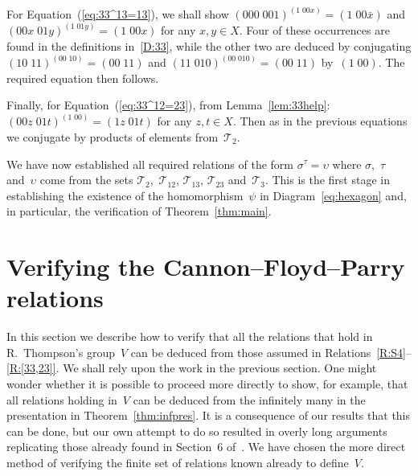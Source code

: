 \documentclass[a4paper,11pt]{article}
\numberwithin{equation}{section}
\newcommand{\eqstate}[1]{Equation~(\ref{#1})}
\newcommand{\spc}{\vspace{\baselineskip}}
\newcommand{\swap}[2]{(#1\;#2)}
\newcommand{\Sw}[1]{\mathcal{T}_{#1}}
\begin{document}
For \eqstate{eq:33^13=13}, we shall show
$\swap{000}{001}^{\swap{1}{00x}} = \swap{1}{00\bar{x}}$ and
$\swap{00x}{01y}^{\swap{1}{01y}} = \swap{1}{00x}$ for any $x,y \in X$.
Four of these occurrences are found in the definitions
in~\eqref{D:33}, while the other two are deduced by conjugating
$\swap{10}{11}^{\swap{00}{10}} = \swap{00}{11}$ and
$\swap{11}{010}^{\swap{00}{010}} = \swap{00}{11}$ by~$\swap{1}{00}$.
The required equation then follows.

Finally, for \eqstate{eq:33^12=23}, from
Lemma~\ref{lem:33help}: $\swap{00z}{01t}^{\swap{1}{00}} =
\swap{1z}{01t}$ for any $z,t \in X$.  Then as in the previous
equations we conjugate by products of elements from~$\Sw{2}$.

\spc

We have now established all required relations of the form
$\sigma^{\tau} = \upsilon$ where $\sigma$,~$\tau$ and~$\upsilon$ come
from the sets $\Sw{2}$,~$\Sw{12}$, $\Sw{13}$, $\Sw{23}$ and~$\Sw{3}$.
This is the first stage in establishing the existence of the
homomorphism~$\psi$ in Diagram~\eqref{eq:hexagon} and, in particular,
the verification of Theorem~\ref{thm:main}.


\section{Verifying the Cannon--Floyd--Parry relations}
\label{sec:CFP}

In this section we describe how to verify that all the relations that
hold in R.~Thompson's group~$V$ can be deduced from those assumed in
Relations~\ref{R:S4}--\ref{R:[33,23]}.  We shall rely upon the work in
the previous section.  One might wonder whether it is possible to
proceed more directly to show, for example, that all relations holding
in~$V$ can be deduced from the infinitely many in the presentation in
Theorem~\ref{thm:infpres}.  It is a consequence of our results that
this can be done, but our own attempt to do so resulted in overly long
arguments replicating those already found in Section~6 of~\cite{CFP}.
We have chosen the more direct method of verifying the finite set of
relations known already to define~$V$.
\end{document}
